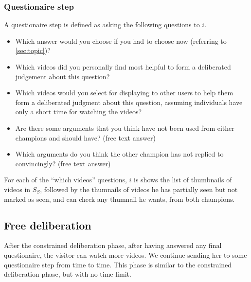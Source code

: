 \documentclass[version=3.21, pagesize, twoside=off, bibliography=totoc, DIV=calc, fontsize=12pt, a4paper]{scrartcl}
\begin{document}
\subsubsection{Questionaire step}
A questionaire step is defined as asking the following questions to $i$. 
\begin{itemize}
	\item Which answer would you choose if you had to choose now (referring to \cref{sec:topic})?
	\item Which videos did you personally find most helpful to form a deliberated judgement about this question?
	\item Which videos would you select for displaying to other users to help them form a deliberated judgment about this question, assuming individuals have only a short time for watching the videos?
	\item Are there some arguments that you think have not been used from either champions and should have? (free text answer)
	\item Which arguments do you think the other champion has not replied to convincingly? (free text answer) 
\end{itemize}
For each of the “which videos” questions, $i$ is shows the list of thumbnails of videos in $S_S$, followed by the thumnails of videos he has partially seen but not marked as seen, and can check any thumnail he wants, from both champions. 

\subsection{Free deliberation}
After the constrained deliberation phase, after having answered any final questionaire, the visitor can watch more videos. We continue sending her to some questionaire step from time to time. This phase is similar to the constrained deliberation phase, but with no time limit.
\end{document}
